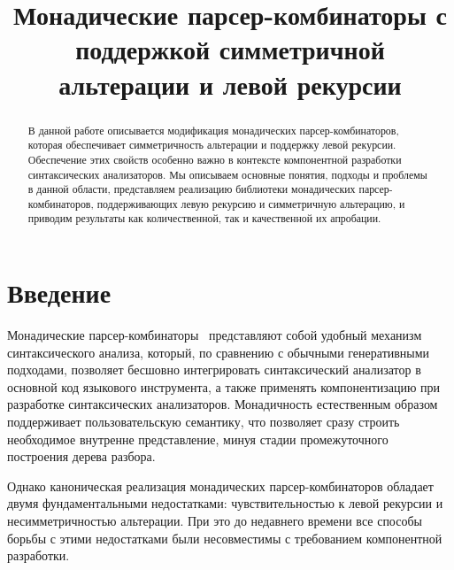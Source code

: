 \documentclass[conference]{IEEEtran}
\begin{document}
\title{Монадические парсер-комбинаторы с поддержкой симметричной альтерации и левой рекурсии}

\author{
}

\maketitle

\begin{abstract}
  В данной работе описывается модификация монадических парсер-комбинаторов, которая обеспечивает симметричность
  альтерации и поддержку левой рекурсии. Обеспечение этих свойств особенно важно в контексте компонентной разработки
  синтаксических анализаторов. Мы описываем основные понятия, подходы и проблемы в данной области,
  представляем реализацию библиотеки монадических парсер-комбинаторов, поддерживающих левую рекурсию и симметричную альтерацию,
  и приводим результаты как количественной, так и качественной их апробации.
\end{abstract}

\begin{IEEEkeywords}
\end{IEEEkeywords}

\section{Введение}

Монадические парсер-комбинаторы~\cite{meijer,wadler} представляют собой удобный механизм синтаксического анализа, который, по сравнению
с обычными генеративными подходами, позволяет бесшовно интегрировать синтаксический анализатор в основной код языкового инструмента, а
также применять компонентизацию при разработке синтаксических анализаторов. Монадичность естественным образом поддерживает пользовательскую
семантику, что позволяет сразу строить необходимое внутренне представление, минуя стадии промежуточного построения дерева разбора.

Однако каноническая реализация монадических парсер-комбинаторов обладает двумя фундаментальными недостатками: чувствительностью
к левой рекурсии и несимметричностью альтерации. При это до недавнего времени все способы борьбы с этими недостатками были
несовместимы с требованием компонентной разработки.
\end{document}
